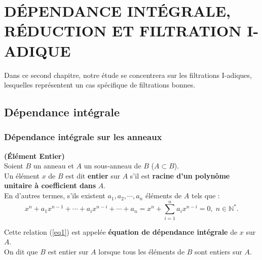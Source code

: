 \chapter{DÉPENDANCE INTÉGRALE, RÉDUCTION ET FILTRATION I-ADIQUE}

Dans ce second chapitre, notre étude se concentrera sur les filtrations I-adiques, lesquelles représentent un cas spécifique de filtrations bonnes.

\section{Dépendance intégrale}
\subsection{Dépendance intégrale sur les anneaux}
\begin{madefinition}\textbf{(Élément Entier)}\cite{Di2} \\
	Soient $B$ un anneau et $A$ un sous-anneau de $B$ ($A \subset B$).\\
	Un élément $x$ de $B$ est dit \textbf{entier} sur $A$ s'il est \textbf{racine d'un polynôme unitaire à coefficient dans} $A$.\\
	En d'autres termes, s'ils existent $a_1, a_2, \cdots , a_n$ éléments de $A$ tels que :\\
	\begin{equation}
		\label{eq1}
		x^n + a_1 x^{n-1} +\cdots+a_i x^{n-i} +\cdots + a_n = x^n + \sum_{i=1}^{n} a_i x^{n-i} = 0, \; n \in \mathbb{N^*}.
	\end{equation}
	
	Cette relation (\ref{eq1}) est appelée \textbf{équation de dépendance intégrale} de $x$ sur $A$.\\
	On dit que $B$ est entier sur $A$ lorsque tous les éléments de $B$ sont entiers sur $A$.
\end{madefinition}


